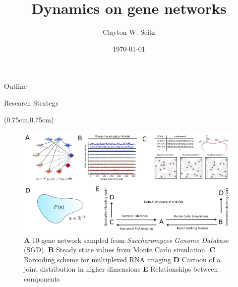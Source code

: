 \documentclass[aspectratio=1610]{beamer}					%
\title{Dynamics on gene networks}	%
\author{Clayton W. Seitz}								%
\date{\today}									%
\begin{document}
\begin{frame}
  \titlepage
\end{frame}

\begin{frame}{Outline}
  \tableofcontents
\end{frame}

%

\begin{frame}{Research Strategy}

\begin{textblock*}{14cm}(0.75cm,0.75cm)
\begin{figure}
\includegraphics[width=14cm]{logic.png}
\caption{\textbf{A} 10-gene network sampled from \emph{Saccharomyces Genome Database} (SGD). \textbf{B} Steady state values from Monte Carlo simulation. \textbf{C} Barcoding scheme for multiplexed RNA imaging \textbf{D} Cartoon of a joint distribution in higher dimensions \textbf{E} Relationships between components}
\end{figure}
\end{textblock*}

\end{frame}
\end{document}
